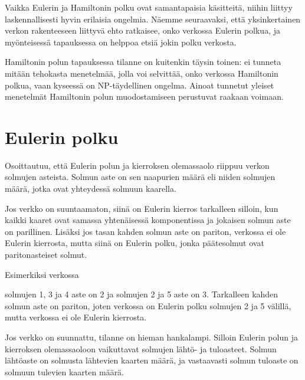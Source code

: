 Vaikka Eulerin ja Hamiltonin polku ovat samantapaisia käsitteitä,
niihin liittyy laskennallisesti hyvin erilaisia ongelmia.
Näemme seuraavaksi, että yksinkertainen verkon rakenteeseen liittyvä
ehto ratkaisee, onko verkossa Eulerin polkua,
ja myönteisessä tapauksessa on helppoa etsiä jokin polku verkosta.

Hamiltonin polun tapauksessa tilanne on kuitenkin täysin toinen:
ei tunneta mitään tehokasta menetelmää, jolla voi selvittää,
onko verkossa Hamiltonin polkua, vaan kyseessä on NP-täydellinen ongelma.
Ainoat tunnetut yleiset menetelmät Hamiltonin polun muodostamiseen perustuvat
raakaan voimaan.

\section{Eulerin polku}

Osoittautuu, että Eulerin polun ja kierroksen olemassaolo riippuu verkon solmujen asteista.
Solmun aste on sen naapurien määrä eli niiden solmujen määrä,
jotka ovat yhteydessä solmuun kaarella.

Jos verkko on suuntaamaton,
siinä on Eulerin kierros tarkalleen silloin,
kun kaikki kaaret ovat samassa yhtenäisessä
komponentissa ja jokaisen solmun aste on parillinen.
Lisäksi jos tasan kahden solmun aste on pariton,
verkossa ei ole Eulerin kierrosta, mutta siinä
on Eulerin polku, jonka päätesolmut ovat
paritonasteiset solmut.

\begin{samepage}
Esimerkiksi verkossa
\begin{center}
\end{center}
\end{samepage}

solmujen 1, 3 ja 4 aste on 2 ja solmujen 2 ja 5 aste on 3.
Tarkalleen kahden solmun aste on pariton,
joten verkossa on Eulerin polku solmujen 2 ja 5 välillä,
mutta verkossa ei ole Eulerin kierrosta.

Jos verkko on suunnattu, tilanne on hieman hankalampi.
Silloin Eulerin polun ja kierroksen olemassaoloon
vaikuttavat solmujen lähtö- ja tuloasteet.
Solmun lähtöaste on solmusta lähtevien kaarten määrä,
ja vastaavasti solmun tuloaste on solmuun tulevien kaarten määrä.

